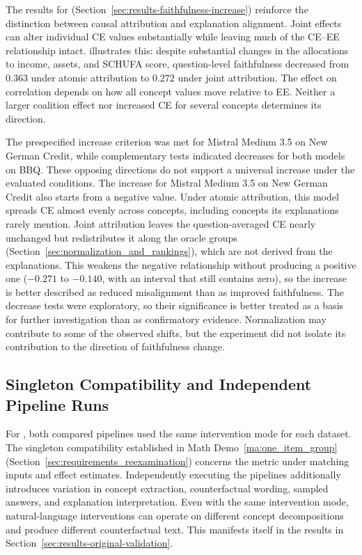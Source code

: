 The results for  (Section~\ref{sec:results-faithfulness-increase}) reinforce the distinction between causal attribution and explanation alignment. Joint effects can alter individual CE values substantially while leaving much of the CE--EE relationship intact.  illustrates this: despite substantial changes in the allocations to income, assets, and SCHUFA score, question-level faithfulness decreased from $0.363$ under atomic attribution to $0.272$ under joint attribution. The effect on correlation depends on how all concept values move relative to EE. Neither a larger coalition effect nor increased CE for several concepts determines its direction.

The prespecified increase criterion was met for Mistral Medium 3.5 on New German Credit, while complementary tests indicated decreases for both models on BBQ. These opposing directions do not support a universal increase under the evaluated conditions. The increase for Mistral Medium 3.5 on New German Credit also starts from a negative value. Under atomic attribution, this model spreads CE almost evenly across concepts, including concepts its explanations rarely mention. Joint attribution leaves the question-averaged CE nearly unchanged but redistributes it along the oracle groups (Section~\ref{sec:normalization_and_rankings}), which are not derived from the explanations. This weakens the negative relationship without producing a positive one ($-0.271$ to $-0.140$, with an interval that still contains zero), so the increase is better described as reduced misalignment than as improved faithfulness. The decrease tests were exploratory, so their significance is better treated as a basis for further investigation than as confirmatory evidence. Normalization may contribute to some of the observed shifts, but the experiment did not isolate its contribution to the direction of faithfulness change.

\subsection{Singleton Compatibility and Independent Pipeline Runs}
\label{sec:singleton_compatibility}

For , both compared pipelines used the same intervention mode for each dataset. The singleton compatibility established in Math Demo~\ref{ma:one_item_group} (Section~\ref{sec:requirements_reexamination}) concerns the metric under matching inputs and effect estimates. Independently executing the pipelines additionally introduces variation in concept extraction, counterfactual wording, sampled answers, and explanation interpretation. Even with the same intervention mode, natural-language interventions can operate on different concept decompositions and produce different counterfactual text. This manifests itself in the results in Section~\ref{sec:results-original-validation}.

